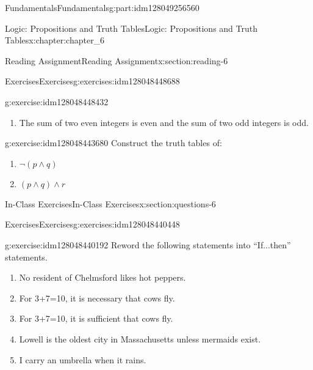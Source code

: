\documentclass[oneside,10pt,]{book}
\numberwithin{equation}{section}
\begin{document}
\begin{partptx}{Fundamentals}{}{Fundamentals}{}{}{g:part:idm128049256560}
\begin{chapterptx}{Logic: Propositions and Truth Tables}{}{Logic: Propositions and Truth Tables}{}{}{x:chapter:chapter_6}
\begin{sectionptx}{Reading Assignment}{}{Reading Assignment}{}{}{x:section:reading-6}
\begin{exercises-subsection}{Exercises}{}{Exercises}{}{}{g:exercises:idm128048448688}
\begin{exercisegroup}
\begin{divisionexerciseeg}{1}{}{}{g:exercise:idm128048448432}
\begin{enumerate}[label=(\alph*)]
\item{}The sum of two even integers is even and the sum of two odd integers is odd.%
\end{enumerate}
%
\end{divisionexerciseeg}%
\begin{divisionexerciseeg}{2}{}{}{g:exercise:idm128048443680}%
Construct the truth tables of:%
\begin{multicols}{2}
\begin{enumerate}[label=(\alph*)]
\item{}\(\displaystyle \neg (p\land  q )\)%
\item{}\(\displaystyle (p \land q)\land r\)%
\end{enumerate}
\end{multicols}
%
\end{divisionexerciseeg}%
\end{exercisegroup}
\par\medskip\noindent
\end{exercises-subsection}
\end{sectionptx}
%
%
\typeout{************************************************}
\typeout{************************************************}
%
\begin{sectionptx}{In-Class Exercises}{}{In-Class Exercises}{}{}{x:section:questions-6}
%
%
%
\typeout{************************************************}
\typeout{************************************************}
%
\begin{exercises-subsection}{Exercises}{}{Exercises}{}{}{g:exercises:idm128048440448}
\par\medskip\noindent%
%
\begin{exercisegroup}
\begin{divisionexerciseeg}{1}{}{}{g:exercise:idm128048440192}%
Reword the following statements into ``If...then'' statements.%
\begin{enumerate}[label=(\alph*)]
\item{}No resident of Chelmsford likes hot peppers.%
\item{}For 3+7=10, it is necessary that cows fly.%
\item{}For 3+7=10, it is sufficient that cows fly.%
\item{}Lowell is the oldest city in Massachusetts unless mermaids exist.%
\item{}I carry an umbrella when it rains.%
\end{enumerate}
%
\end{divisionexerciseeg}%

\end{exercisegroup}
\end{exercises-subsection}
\end{sectionptx}
\end{chapterptx}
\end{partptx}
\end{document}
